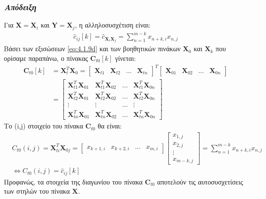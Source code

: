 \subsubsection*{\small{\textit{Απόδειξη}}}
Για $\mathbf{X} = \mathbf{X}_i$ και $\mathbf{Y} = \mathbf{X}_j$, η αλληλοσυσχέτιση είναι:
\begin{align*}
    \hat{c}_{ij}[k] = \hat{c}_{\mathbf{X}_i \mathbf{X}_j} =  
    \sum \limits_{n=1}^{m-k} x_{n+k,i} x_{n,j}
\end{align*}
Βάσει των εξισώσεων \eqref{eq:4.1.9d} και των βοηθητικών πινάκων $\mathbf{X}_0$ και $\mathbf{X}_k$ που ορίσαμε παραπάνω, ο πίνακας $\mathbf{C}_{t0}[k]$ γίνεται:
\begin{align*}
    \mathbf{C}_{t0}[k] &= \mathbf{X}_t^T \mathbf{X}_0 = 
    \begin{bmatrix}
    \mathbf{X}_{t1} & \mathbf{X}_{t2} & \ldots & \mathbf{X}_{tn}
    \end{bmatrix}^T
    \begin{bmatrix}
    \mathbf{X}_{01} & \mathbf{X}_{02} & \ldots & \mathbf{X}_{0n}
    \end{bmatrix} \\
    &= \begin{bmatrix}
    \mathbf{X}_{t1}^T \mathbf{X}_{01} & \mathbf{X}_{t1}^T\mathbf{X}_{02} & \ldots & \mathbf{X}_{t1}^T \mathbf{X}_{0n} \\
    \mathbf{X}_{t2}^T \mathbf{X}_{01} & \mathbf{X}_{t2}^T\mathbf{X}_{02} & \ldots & \mathbf{X}_{t2}^T \mathbf{X}_{0n} \\
    \vdots & \vdots & \ldots & \vdots \\
    \mathbf{X}_{tn}^T \mathbf{X}_{01} & \mathbf{X}_{tn}^T\mathbf{X}_{02} & \ldots & \mathbf{X}_{tn}^T \mathbf{X}_{0n}
    \end{bmatrix}
\end{align*}
Το (i,j) στοιχείο του πίνακα $\mathbf{C}_{t0}$ θα είναι:
\begin{align*}
    &C_{t0}(i,j) = \mathbf{X}_{ti}^T \mathbf{X}_{0j} = 
    \begin{bmatrix}
    x_{k+1,i} & x_{k+2,i} & \ldots & x_{m,i}
    \end{bmatrix}
    \begin{bmatrix}
    x_{1,j} \\ x_{2,j} \\ \vdots \\ x_{m-k,j}
    \end{bmatrix} = \sum \limits_{n=1}^{m-k} x_{n+k,i}x_{n,j} \\
    &\Leftrightarrow C_{t0}(i,j) = \hat{c}_{ij}[k]
\end{align*}
Προφανώς, τα στοιχεία της διαγωνίου του πίνακα $\mathbf{C}_{t0}$ αποτελούν τις αυτοσυσχετίσεις των στηλών του πίνακα $\mathbf{X}$.
